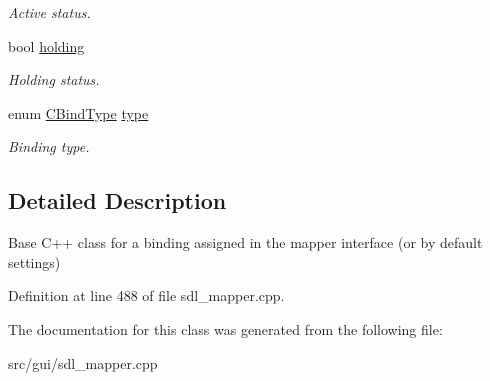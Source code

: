\begin{DoxyCompactItemize}
\begin{DoxyCompactList}\small\item\em Active status. \end{DoxyCompactList}\item 
\hypertarget{classCBind_a4a0d6d7650d3a24cc0bc68c985d26ade}{bool \hyperlink{classCBind_a4a0d6d7650d3a24cc0bc68c985d26ade}{holding}}\label{classCBind_a4a0d6d7650d3a24cc0bc68c985d26ade}

\begin{DoxyCompactList}\small\item\em Holding status. \end{DoxyCompactList}\item 
\hypertarget{classCBind_a9e5121ab697c2c56cb20a20bd151ac45}{enum \hyperlink{classCBind_a6bd04329a3b3b8673f7bd4469f92eb61}{C\-Bind\-Type} \hyperlink{classCBind_a9e5121ab697c2c56cb20a20bd151ac45}{type}}\label{classCBind_a9e5121ab697c2c56cb20a20bd151ac45}

\begin{DoxyCompactList}\small\item\em Binding type. \end{DoxyCompactList}\end{DoxyCompactItemize}


\subsection{Detailed Description}
Base C++ class for a binding assigned in the mapper interface (or by default settings) 

Definition at line 488 of file sdl\-\_\-mapper.\-cpp.



The documentation for this class was generated from the following file\-:\begin{DoxyCompactItemize}
\item 
src/gui/sdl\-\_\-mapper.\-cpp\end{DoxyCompactItemize}
